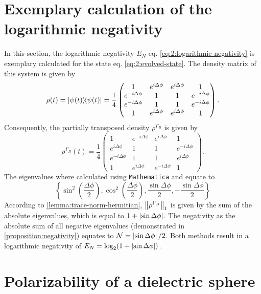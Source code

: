 \section{Exemplary calculation of the logarithmic negativity}\label{apx:E_N-exemplary}
In this section, the logarithmic negativity $E_N$ eq. \eqref{eq:2:logarithmic-negativity} is exemplary calculated for the state eq. \eqref{eq:2:evolved-state}.
The density matrix of this system is given by
\begin{equation}
  \rho(t) = \ketbra{\psi(t)} = \frac{1}{4}
  \begin{pmatrix}
    1 & e^{i\Delta\phi}  & e^{i\Delta\phi} & 1 \\
    e^{-i\Delta\phi} & 1 & 1  & e^{-i\Delta\phi} \\
    e^{-i\Delta\phi} & 1  & 1 & e^{-i\Delta\phi} \\
    1 & e^{i\Delta\phi} & e^{i\Delta\phi} & 1
  \end{pmatrix}.
\end{equation}
Consequently, the partially transposed density $\rho^{\Gamma_B}$ is given by
\begin{equation}
  \rho^{\Gamma_B}(t) = \frac{1}{4}
  \begin{pmatrix}
    1 & e^{-i\Delta\phi}  & e^{i\Delta\phi} & 1 \\
    e^{i\Delta\phi} & 1 & 1  & e^{-i\Delta\phi} \\
    e^{-i\Delta\phi} & 1  & 1 & e^{i\Delta\phi} \\
    1 & e^{i\Delta\phi} & e^{-i\Delta\phi} & 1
  \end{pmatrix}.
\end{equation}
The eigenvalues where calculated using \texttt{Mathematica} and equate to
\begin{equation*}
  \left\{ \sin^2\left(\frac{\Delta\phi}{2}\right), \cos^2\left(\frac{\Delta\phi}{2}\right), \frac{\sin\Delta\phi}{2}, -\frac{\sin\Delta\phi}{2} \right\}
\end{equation*}
According to \cref{lemma:trace-norm-hermitian}, $\left\lVert\rho^{\Gamma_B}\right\rVert_1$ is given by the sum of the absolute eigenvalues, which is equal to $1+\left\lvert\sin\Delta\phi\right\rvert$. The negativity as the absolute sum of all negative eigenvalues (demonstrated in \cref{proposition:negativity}) equates to $\mathcal{N} = \left\lvert\sin\Delta\phi\right\rvert/2$. Both methods result in a logarithmic negativity of $E_N = \log_2(1 + \left\lvert\sin\Delta\phi\right\rvert)$.




\section{Polarizability of a dielectric sphere}
\label{apx:polarizability-sphere}

